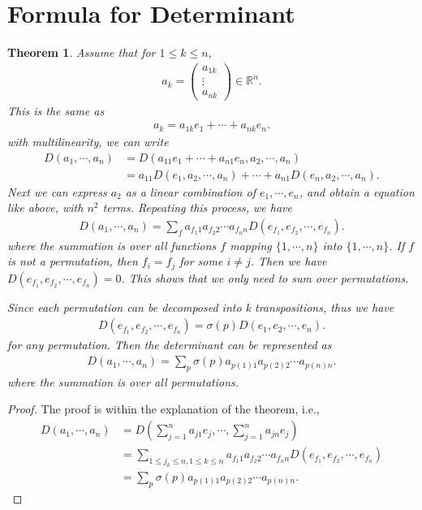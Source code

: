 \documentclass[11pt]{book}
\newtheorem{theorem}{Theorem}[chapter]
\theoremstyle{definition}
\numberwithin{equation}{chapter}
\begin{document}
\medskip

\section{Formula for Determinant}
\begin{theorem}
Assume that for $1\leq k \leq n$, 
\begin{align*}
    a_k = \left(
    \begin{matrix}
        a_{1k} \\
        \vdots \\
        a_{n k}
    \end{matrix}
    \right)\in\mathbb{R}^n.
\end{align*}
This is the same as 
\begin{align*}
    a_k = a_{1k}e_1 + \cdots + a_{nk}e_n.
\end{align*}
with multilinearity, we can write
\begin{align*}
    D(a_1,\cdots,a_n) & = D(a_{11}e_1 + \cdots + a_{n1}e_n, a_2,\cdots,a_n) \\
    & = a_{11}D(e_1,a_2,\cdots,a_n) + \cdots + a_{n1}D(e_n,a_2,\cdots,a_n).
\end{align*}
Next we can express $a_2$ as a linear combination of $e_1,\cdots,e_n$, and obtain a equation like above, with $n^2$ terms. Repeating this process, we have
\begin{align*}
    D(a_1,\cdots,a_n) = \sum_f a_{f_1 1}a_{f_2 2}\cdots a_{f_n n} D(e_{f_1}, e_{f_2},\cdots, e_{f_n}).
\end{align*}
where the summation is over all functions $f$ mapping $\{1,\cdots,n\}$ into $\{1,\cdots,n\}$. If $f$ is not a permutation, then $f_i = f_j$ for some $i\neq j$. Then we have $D(e_{f_1}, e_{f_2},\cdots, e_{f_n}) = 0$. This shows that we only need to sum over permutations.

Since each permutation can be decomposed into k transpositions, thus we have 
\begin{align*}
    D(e_{f_1}, e_{f_2},\cdots, e_{f_n}) = \sigma(p) D(e_1, e_2,\cdots, e_n).
\end{align*}
for any permutation. Then the determinant can be represented as
\begin{align*}
    D(a_1,\cdots,a_n) = \sum_p \sigma(p) a_{p(1)1} a_{p(2)2} \cdots a_{p(n)n}.
\end{align*}
where the summation is over all permutations.
\end{theorem}
\begin{proof}
The proof is within the explanation of the theorem, i.e., 
\begin{align*}
    D(a_1,\cdots,a_n) & = D\left(\sum^n_{j=1}a_{j1}e_j, \cdots, \sum^n_{j=1}a_{jn}e_j\right) \\
    & = \sum_{1\leq j_k \leq n, 1\leq k \leq n} a_{f_1 1}a_{f_2 2}\cdots a_{f_n n} D(e_{f_1}, e_{f_2},\cdots, e_{f_n}) \\
    & = \sum_p \sigma(p) a_{p(1)1} a_{p(2)2} \cdots a_{p(n)n}.
\end{align*}
\end{proof}
\end{document}
